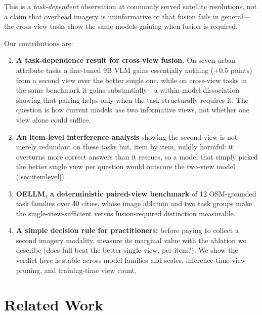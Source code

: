 This is a \emph{task-dependent} observation at commonly served satellite resolutions,
not a claim that overhead imagery is uninformative or that fusion fails in
general---the cross-view tasks show the same models gaining when fusion is required.

Our contributions are:
\begin{enumerate}[itemsep=1pt,topsep=2pt]
  \item \textbf{A task-dependence result for cross-view fusion.} On seven
  urban-attribute tasks a fine-tuned 9B VLM gains essentially nothing
  ($+\num{0.5}$ points) from a second view over the better single one, while on
  cross-view tasks in the same benchmark it gains substantially---a within-model
  dissociation showing that pairing helps only when the task structurally requires
  it. The question is how current models \emph{use} two informative views, not
  whether one view alone could suffice.
  \item \textbf{An item-level interference analysis} showing the second view is not
  merely redundant on these tasks but, item by item, mildly harmful: it overturns
  more correct answers than it rescues, so a model that simply picked the better
  single view per question would outscore the two-view model (\cref{sec:itemlevel}).
  \item \textbf{OELLM, a deterministic paired-view benchmark} of \num{12}
  OSM-grounded task families over \num{40} cities, whose image ablation and two
  task groups make the single-view-sufficient versus fusion-required distinction
  measurable.
  \item \textbf{A simple decision rule for practitioners:} before paying to collect
  a second imagery modality, measure its marginal value with the ablation we
  describe (does \textsf{full} beat the better single view, per item?). We show the
  verdict here is stable across model families and scales, inference-time view
  pruning, and training-time view count.
\end{enumerate}

\section{Related Work}
\label{sec:related}

